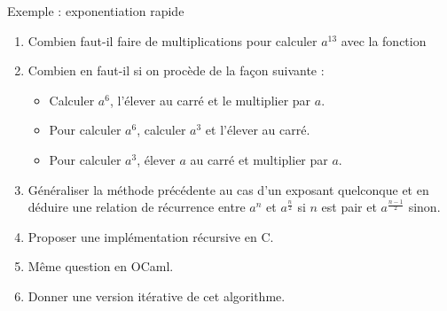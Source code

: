 \documentclass[10pt]{beamer}
\begin{document}
\begin{frame}[fragile]{\Ctitle}{\stitle}
	\begin{exampleblock}{Exemple : exponentiation rapide}
		\begin{enumerate}
			\item<1-> Combien faut-il faire de multiplications pour calculer $a^{13}$ avec la fonction
			\item<2-> Combien en faut-il si on procède de la façon suivante :
				\begin{itemize}
					\item<3-> Calculer $a^6$, l'élever au carré et le multiplier par $a$.
					\item<4-> Pour calculer $a^6$, calculer $a^3$ et l'élever au carré.
					\item<5-> Pour calculer $a^3$, élever $a$ au carré et multiplier par $a$.
				\end{itemize}
			\item<6-> Généraliser la méthode précédente au cas d'un exposant quelconque et en déduire une relation de récurrence entre $a^n$ et $a^\frac{n}{2}$ si $n$ est pair et $a^\frac{n-1}{2}$ sinon.
			\item<7-> Proposer une implémentation récursive en C.
			\item<8-> Même question en OCaml.
			\item<9-> Donner une version itérative de cet algorithme.
		\end{enumerate}
	\end{exampleblock}
\end{frame}
\end{document}
